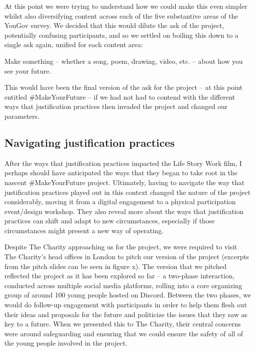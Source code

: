 At this point we were trying to understand how we could make this even simpler whilst also diversifying content across each of the five substantive areas of the YouGov survey. We decided that this would dilute the ask of the project, potentially confusing participants, and so we settled on boiling this down to a single ask again, unified for each content area:

Make something – whether a song, poem, drawing, video, etc. – about how you see your future. 

This would have been the final version of the ask for the project – at this point entitled \#MakeYourFuture – if we had not had to contend with the different ways that justification practices then invaded the project and changed our parameters. 

\subsection{Navigating justification practices}

After the ways that justification practices impacted the Life Story Work film, I perhaps should have anticipated the ways that they began to take root in the nascent #MakeYourFuture project.  Ultimately, having to navigate the way that justification practices played out in this context changed the nature of the project considerably, moving it from a digital engagement to a physical participation event/design workshop. They also reveal more about the ways that justification practices can shift and adapt to new circumstances, especially if those circumstances might present a new way of operating. 

Despite The Charity approaching us for the project, we were required to visit The Charity’s head offices in London to pitch our version of the project (excerpts from the pitch slides can be seen in figure x). The version that we pitched reflected the project as it has been explored so far – a two-phase interaction, conducted across multiple social media platforms, rolling into a core organizing group of around 100 young people hosted on Discord. Between the two phases, we would do follow-up engagement with participants in order to help them flesh out their ideas and proposals for the future and politicize the issues that they saw as key to a future. When we presented this to The Charity, their central concerns were around safeguarding and ensuring that we could ensure the safety of all of the young people involved in the project. 

